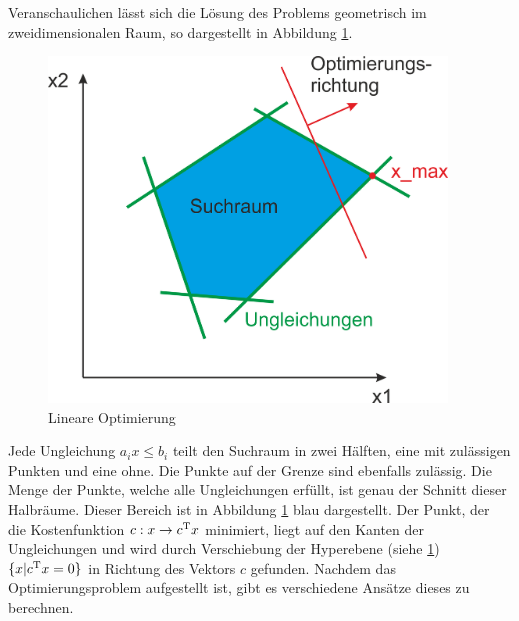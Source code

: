 \documentclass{like}
\begin{document}
Veranschaulichen lässt sich die Lösung des Problems geometrisch im zweidimensionalen Raum, so dargestellt in Abbildung \ref*{fig:linOpt}.

\begin{figure}[ht!]
	\centering
	\includegraphics[width=300pt]{Abbildungen/linearOpt.png}
	\caption{Lineare Optimierung}
	\label{fig:linOpt}
\end{figure}

Jede Ungleichung $a_i x \leq b_i$ teilt den Suchraum in zwei Hälften, eine mit zulässigen Punkten und eine ohne. Die Punkte auf der Grenze sind ebenfalls zulässig. Die Menge der Punkte, welche alle Ungleichungen erfüllt, ist genau der Schnitt dieser Halbräume. Dieser Bereich ist in Abbildung \ref{fig:linOpt} blau dargestellt. Der Punkt, der die Kostenfunktion $c: x \rightarrow c\textsuperscript{T} x$ minimiert, liegt auf den Kanten der Ungleichungen und wird durch Verschiebung der Hyperebene (siehe \ref{fig:linOpt}) $ \{x| c\textsuperscript{T} x = 0 \}$ in Richtung des Vektors \(c\) gefunden. Nachdem das Optimierungsproblem aufgestellt ist, gibt es verschiedene Ansätze dieses zu berechnen.
\end{document}
